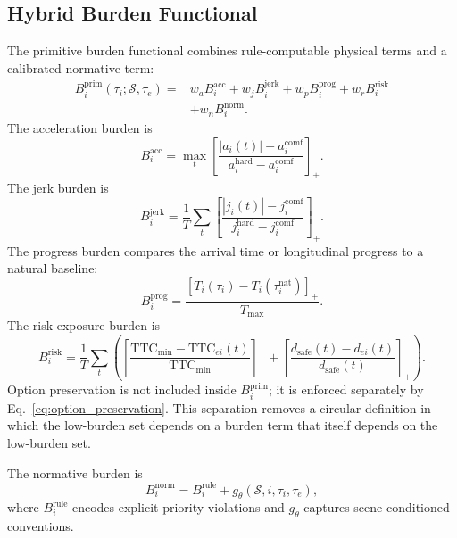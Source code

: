\documentclass[10pt]{article}
\begin{document}
\subsection{Hybrid Burden Functional}
\label{app:burden}

The primitive burden functional combines rule-computable physical terms and a calibrated normative term:
\begin{equation}
\begin{aligned}
    B_i^{\mathrm{prim}}(\tau_i;\mathcal{S},\tau_e)
    =
    &
    w_a B^{\mathrm{acc}}_i
    +
    w_j B^{\mathrm{jerk}}_i
    +
    w_p B^{\mathrm{prog}}_i
    +
    w_r B^{\mathrm{risk}}_i \\
    &
    +
    w_n B^{\mathrm{norm}}_i .
\end{aligned}
\end{equation}
The acceleration burden is
\begin{equation}
    B^{\mathrm{acc}}_i
    =
    \max_t
    \left[
    \frac{|a_i(t)|-a^{\mathrm{comf}}_i}
    {a^{\mathrm{hard}}_i-a^{\mathrm{comf}}_i}
    \right]_+ .
\end{equation}
The jerk burden is
\begin{equation}
    B^{\mathrm{jerk}}_i
    =
    \frac{1}{T}
    \sum_t
    \left[
    \frac{|j_i(t)|-j^{\mathrm{comf}}_i}
    {j^{\mathrm{hard}}_i-j^{\mathrm{comf}}_i}
    \right]_+ .
\end{equation}
The progress burden compares the arrival time or longitudinal progress to a natural baseline:
\begin{equation}
    B^{\mathrm{prog}}_i
    =
    \frac{
    \left[
    T_i(\tau_i)-T_i(\tau_i^{\mathrm{nat}})
    \right]_+
    }{
    T_{\max}
    } .
\end{equation}
The risk exposure burden is
\begin{equation}
    B^{\mathrm{risk}}_i
    =
    \frac{1}{T}
    \sum_t
    \left(
    \left[
    \frac{\mathrm{TTC}_{\min}-\mathrm{TTC}_{ei}(t)}
    {\mathrm{TTC}_{\min}}
    \right]_+
    +
    \left[
    \frac{d_{\mathrm{safe}}(t)-d_{ei}(t)}
    {d_{\mathrm{safe}}(t)}
    \right]_+
    \right).
\end{equation}
Option preservation is not included inside $B_i^{\mathrm{prim}}$; it is enforced separately by Eq.~\eqref{eq:option_preservation}. This separation removes a circular definition in which the low-burden set depends on a burden term that itself depends on the low-burden set.

The normative burden is
\begin{equation}
    B^{\mathrm{norm}}_i
    =
    B^{\mathrm{rule}}_i
    +
    g_\theta(\mathcal{S},i,\tau_i,\tau_e),
\end{equation}
where $B^{\mathrm{rule}}_i$ encodes explicit priority violations and $g_\theta$ captures scene-conditioned conventions.
\end{document}
